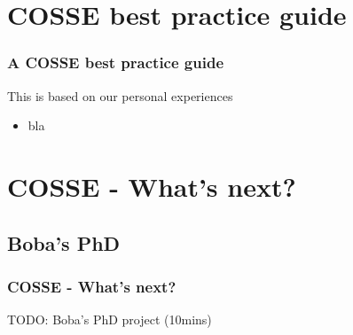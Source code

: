 \documentclass{beamer}
\begin{document}
\section{COSSE best practice guide}
\begin{frame}
\frametitle{A COSSE best practice guide}
This is based on our personal experiences
\begin{itemize}
 \item bla
\end{itemize}

\end{frame}

\section{COSSE - What's next?}
\subsection{Boba's PhD}
\begin{frame}
\frametitle{COSSE - What's next?}
 TODO: Boba's PhD project (10mins)
\end{frame}
\end{document}
